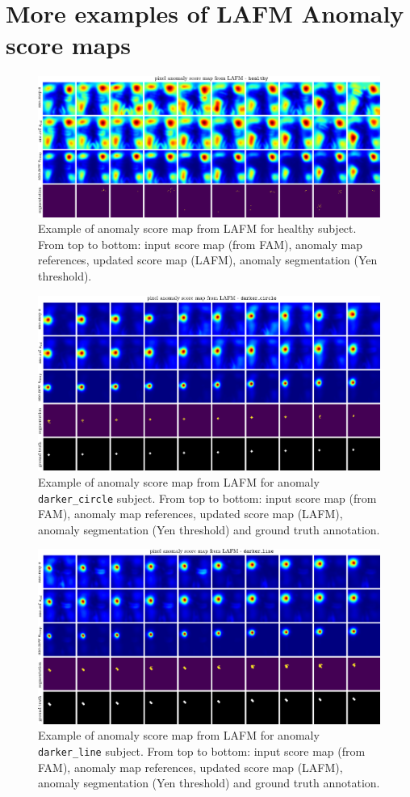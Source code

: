 \chapter{More examples of LAFM Anomaly score maps}
\begin{figure}[htbp]
    \centering
    \includegraphics[width=0.75\linewidth]{figures/app-lafm-healthy.pdf}
    \caption[Example: anomaly segmentation from LAFM - \texttt{healthy} subject]{Example of anomaly score map from LAFM for healthy subject. From top to bottom: input score map (from FAM), anomaly map references, updated score map (LAFM), anomaly segmentation (Yen threshold).}   
\end{figure}

\begin{figure}[htbp]
    \centering
    \includegraphics[width=0.75\linewidth]{figures/app-lafm-darkercircle.pdf}
    \caption[Example: anomaly segmentation from LAFM - \texttt{darker\_circle}]{Example of anomaly score map from LAFM for anomaly \texttt{darker\_circle} subject. From top to bottom: input score map (from FAM), anomaly map references, updated score map (LAFM), anomaly segmentation (Yen threshold) and ground truth annotation.}   
\end{figure}

\begin{figure}[htbp]
    \centering
    \includegraphics[width=0.75\linewidth]{figures/app-lafm-darkerline.pdf}
    \caption[Example: anomaly segmentation from LAFM - \texttt{darker\_line}]{Example of anomaly score map from LAFM for anomaly \texttt{darker\_line} subject. From top to bottom: input score map (from FAM), anomaly map references, updated score map (LAFM), anomaly segmentation (Yen threshold) and ground truth annotation.}   
\end{figure}
\FloatBarrier
